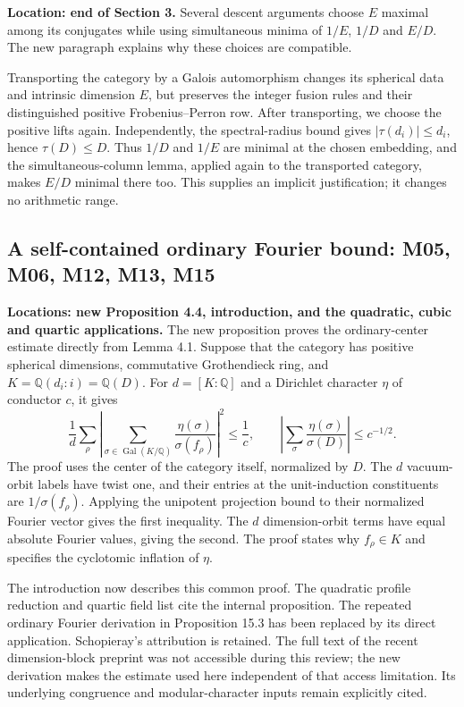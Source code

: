 \documentclass[11pt,a4paper]{article}
\begin{document}
\textbf{Location: end of Section 3.}
Several descent arguments choose $E$ maximal among its conjugates while
using simultaneous minima of $1/E$, $1/D$ and $E/D$. The new paragraph
explains why these choices are compatible.

Transporting the category by a Galois automorphism changes its spherical
data and intrinsic dimension $E$, but preserves the integer fusion rules
and their distinguished positive Frobenius--Perron row. After transporting,
we choose the positive lifts again. Independently, the spectral-radius
bound gives $|\tau(d_i)|\le d_i$, hence $\tau(D)\le D$. Thus $1/D$
and $1/E$ are minimal at the chosen embedding, and the simultaneous-column
lemma, applied again to the transported category, makes $E/D$ minimal
there too. This supplies an implicit justification; it changes no
arithmetic range.

\subsection{A self-contained ordinary Fourier bound: M05, M06, M12, M13, M15}

\textbf{Locations: new Proposition 4.4, introduction, and the quadratic,
cubic and quartic applications.}
The new proposition proves the ordinary-center estimate directly from
Lemma 4.1. Suppose that the category has positive spherical dimensions,
commutative Grothendieck ring, and
$K=\mathbb Q(d_i:i)=\mathbb Q(D)$. For $d=[K:\mathbb Q]$ and a
Dirichlet character $\eta$ of conductor $c$, it gives
\[
 \frac1d\sum_\rho\left|\sum_{\sigma\in\operatorname{Gal}(K/\mathbb Q)}
 \frac{\eta(\sigma)}{\sigma(f_\rho)}\right|^2\le\frac1c,
 \qquad
 \left|\sum_\sigma\frac{\eta(\sigma)}{\sigma(D)}\right|
 \le c^{-1/2}.
\]
The proof uses the center of the category itself, normalized by $D$.
The $d$ vacuum-orbit labels have twist one, and their entries at the
unit-induction constituents are $1/\sigma(f_\rho)$. Applying the
unipotent projection bound to their normalized Fourier vector gives
the first inequality. The $d$ dimension-orbit terms have equal absolute
Fourier values, giving the second. The proof states why $f_\rho\in K$
and specifies the cyclotomic inflation of $\eta$.

The introduction now describes this common proof. The quadratic profile
reduction and quartic field list cite the internal proposition. The
repeated ordinary Fourier derivation in Proposition 15.3 has been
replaced by its direct application. Schopieray's attribution is retained.
The full text of the recent dimension-block preprint was not accessible
during this review; the new derivation makes the estimate used here
independent of that access limitation. Its underlying congruence and
modular-character inputs remain explicitly cited.
\end{document}
